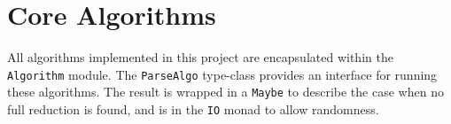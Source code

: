 \documentclass[12pt,a4paper,twoside,openany]{report} \usepackage[pdfborder={0 0 0}]{hyperref}    %
\theoremstyle{definition} \newtheorem{definition}{Definition}[section]
\begin{document}
%
%
%
%
%
%
%

\section{Core Algorithms} 
\label{sec:coreAlgorithms}

All algorithms implemented in this project are encapsulated within the \texttt{Algorithm} module.
The \texttt{ParseAlgo} type-class provides an interface for running these algorithms. 
The result is wrapped in a \texttt{Maybe} to describe the case when no full reduction is found, 
and is in the \texttt{IO} monad to allow randomness.
\end{document}
